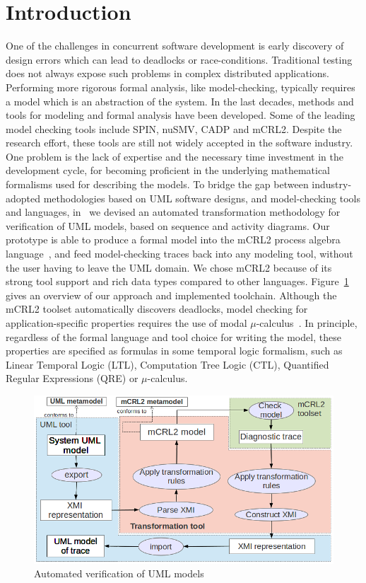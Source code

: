 \documentclass[letter]{llncs}
\newcommand{\figshrink}{\vspace{-.6cm}}
\newcommand{\figshrinkend}{}
\begin{document}
\section{Introduction}
\label{sec:Introduction}
One of the challenges in concurrent software development is early discovery of design errors which can lead to deadlocks or race-conditions.
Traditional testing does not always expose such problems in complex distributed applications. Performing more rigorous formal analysis, like model-checking, 
typically requires a model which is an abstraction of the system.
In the last decades, methods and tools
for modeling and formal analysis have been developed. Some of the leading model checking tools include SPIN, nuSMV, CADP and mCRL2. 
Despite the research effort, these tools are still not widely accepted in the software industry. One problem is the lack of expertise and
the necessary time investment in the development cycle, for becoming proficient in
the underlying mathematical formalisms used for describing the models. 
To bridge the gap between industry-adopted methodologies based on UML software
designs, and model-checking tools and languages, in~\cite{DBLP:dblp_conf/nfm/RemenskaTWHVCB13} we devised 
an automated transformation methodology for verification of UML
models, based on sequence and activity diagrams. Our prototype is able to produce
a formal model into the mCRL2 process algebra language~\cite{FormalLanguagemCRL2}, and feed model-checking traces back into any modeling
tool, without the user having to leave the UML domain. We chose mCRL2 because of its strong tool support and rich data types compared to other languages.
Figure~\ref{fig:approach} gives an overview of our approach and implemented toolchain.
Although the mCRL2 toolset automatically discovers deadlocks, model checking
for application-specific properties requires the use of modal $\mu$-calculus~\cite{Groote05model-checkingprocesses}. In principle, regardless of the formal language and tool choice for writing the model, these properties 
are specified as formulas in some temporal logic formalism, such as Linear Temporal Logic (LTL), Computation Tree Logic (CTL), Quantified Regular Expressions (QRE) or $\mu$-calculus.
\begin{figure}[!t]
\centering
\figshrink
\includegraphics[width=0.7\linewidth,keepaspectratio=true]{./Approach.png}
\caption{Automated verification of UML models}
\label{fig:approach}
\figshrinkend
\end{figure}
\end{document}
